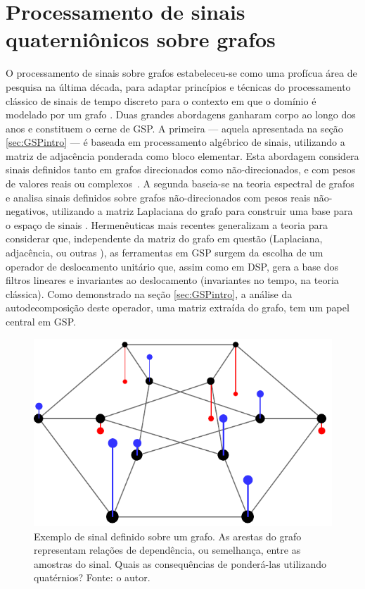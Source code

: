 \chapter{Processamento de sinais quaterni\^onicos sobre grafos}
\label{ch:QGSP}

O processamento de sinais sobre grafos estabeleceu-se como uma prof\'icua \'area de pesquisa na \'ultima d\'ecada, para adaptar princ\'ipios e t\'ecnicas do processamento cl\'assico de sinais de tempo discreto para o contexto em que o dom\'inio \'e modelado por um grafo \cite{ortega2018graph}.
Duas grandes abordagens ganharam corpo ao longo dos anos e constituem o cerne de GSP. A primeira --- aquela apresentada na se\c c\~ao \ref{sec:GSPintro} --- \'e baseada em processamento alg\'ebrico de sinais, utilizando a matriz de adjac\^encia ponderada como bloco elementar. Esta abordagem considera sinais definidos tanto em grafos direcionados como n\~ao-direcionados, e com pesos de valores reais ou complexos~\cite{sandryhaila2014big}. A segunda baseia-se na teoria espectral de grafos e analisa sinais definidos sobre grafos n\~ao-direcionados com pesos reais n\~ao-negativos, utilizando a matriz Laplaciana do grafo para construir uma base para o espa\c{c}o de sinais \cite{shuman2013emerging}. Hermen\^euticas mais recentes generalizam a teoria para considerar que, independente da matriz do grafo em quest\~ao (Laplaciana, adjac\^encia, ou outras \cite{chen2018shift, dees2019unitary}), as ferramentas em GSP surgem da escolha de um operador de deslocamento unit\'ario que, assim como em DSP, gera a base dos filtros lineares e invariantes ao deslocamento (invariantes no tempo, na teoria cl\'assica).
Como demonstrado na se\c c\~ao \ref{sec:GSPintro}, a an\'alise da autodecomposi\c c\~ao deste operador, uma matriz extra\'ida do grafo, tem um papel central em GSP.

\begin{figure}
	\centering
	\includegraphics[width=0.3\linewidth]{Figures/signal_duher_graph_2.pdf}
	\caption{Exemplo de sinal definido sobre um grafo. As arestas do grafo representam rela\c c\~oes de depend\^encia, ou semelhan\c ca, entre as amostras do sinal. Quais as consequ\^encias de ponder\'a-las utilizando quat\'ernios? Fonte: o autor.}
	\label{fig:duher}
\end{figure}

